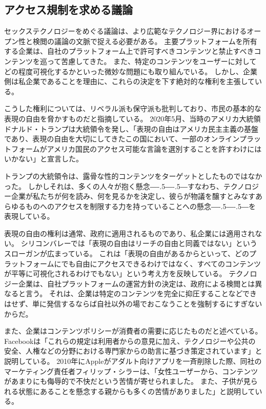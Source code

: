 \documentclass[paper=a4,book,openany]{jlreq}
\def\DDASH{―\kern-.5\zw―\kern-.5\zw―} %
\begin{document}
\subsection{アクセス規制を求める議論}

セックステクノロジーをめぐる議論は、より広範なテクノロジー界におけるオープン性と検閲の議論の文脈で捉える必要がある。
主要プラットフォームを所有する企業は、自社のプラットフォーム上で許可すべきコンテンツと禁止すべきコンテンツを巡って苦慮してきた。
また、特定のコンテンツをユーザーに対してどの程度可視化するかといった微妙な問題にも取り組んでいる\citep{economist20:_social_medias_strug_self}。
しかし、企業側は私企業であることを理由に、これらの決定を下す絶対的な権利を主張している。

こうした権利については、リベラル派も保守派も批判しており、市民の基本的な表現の自由を脅かすものだと指摘している。
2020年5月、当時のアメリカ大統領ドナルド・トランプは大統領令を発し、「表現の自由はアメリカ民主主義の基盤であり、表現の自由を大切にしてきたこの国において、一部のオンラインプラットフォームがアメリカ国民のアクセス可能な言論を選別することを許すわけにはいかない」と宣言した\citep{house20:_execut_order_preven_onlin_censor,lakier21:_great_free_speec_rever}。

トランプの大統領令は、露骨な性的コンテンツをターゲットとしたものではなかった。
しかしそれは、多くの人々が抱く懸念{\DDASH}すなわち、テクノロジー企業が私たちが何を読み、何を見るかを決定し、彼らが物議を醸すとみなすあらゆるものへのアクセスを制限する力を持っていることへの懸念{\DDASH}を表現している。

表現の自由の権利は通常、政府に適用されるものであり、私企業には適用されない。
シリコンバレーでは「表現の自由はリーチの自由と同義ではない」というスローガンが広まっている。
これは「表現の自由があるからといって、どのプラットフォームにでも自由にアクセスできるわけではなく、すべてのコンテンツが平等に可視化されるわけでもない」という考え方を反映している。
テクノロジー企業は、自社プラットフォームの運営方針の決定は、政府による検閲とは異なると言う。
それは、企業は特定のコンテンツを完全に抑圧することなどできはせず、単に発信するならば自社以外の場でおこなうことを強制するにすぎないからだ。

また、企業はコンテンツポリシーが消費者の需要に応じたものだと述べている。
Facebookは「これらの規定は利用者からの意見に加え、テクノロジーや公共の安全、人権などの分野における専門家からの助言に基づき策定されています」と説明している\citep{facebook25:_commun_stand}。
2010年にAppleがアダルト向けアプリを一斉削除した際、同社のマーケティング責任者フィリップ・シラーは、「女性ユーザーから、コンテンツがあまりにも侮辱的で不快だという苦情が寄せられました。
また、子供が見られる状態にあることを懸念する親からも多くの苦情がありました」と説明している\citep{wortham10:_apple_bans_some_apps_sex_tinged_conten}。
\end{document}
